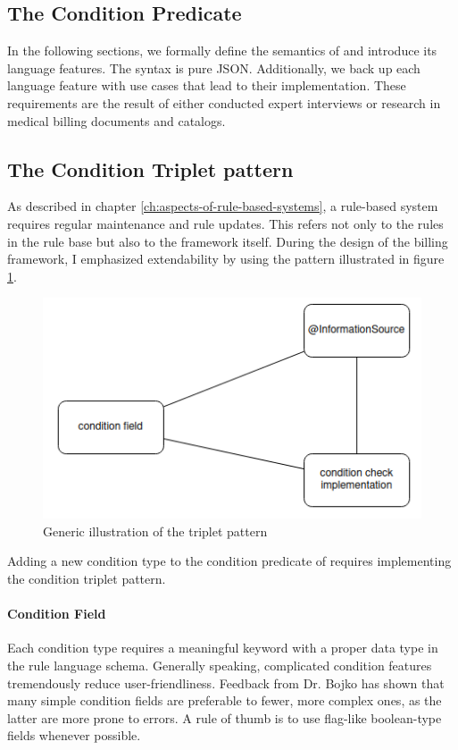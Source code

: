 \subsection{The Condition Predicate}\label{subsec:the-condition-predicate}

In the following sections, we formally define the semantics of \RL and introduce its language features.
The syntax is pure JSON.
Additionally, we back up each language feature with use cases that lead to their implementation.
These requirements are the result of either conducted expert interviews or research in medical billing documents and catalogs.

\subsection{The Condition Triplet pattern}\label{subsec:the-condition-triplet-pattern}
As described in chapter \ref{ch:aspects-of-rule-based-systems}, a rule-based system requires regular maintenance and rule updates.
This refers not only to the rules in the rule base but also to the framework itself.
During the design of the billing framework, I emphasized extendability by using the pattern illustrated in figure \ref{fig:condition-triplet-pattern}.
\begin{figure}
    \centering
    \includegraphics[width=0.75\linewidth]{./figures/condition-triplet-pattern}
    \caption{Generic illustration of the triplet pattern}
    \label{fig:condition-triplet-pattern}
\end{figure}
Adding a new condition type to the condition predicate of \RL requires implementing the condition triplet pattern.

\paragraph{Condition Field}
Each condition type requires a meaningful keyword with a proper data type in the rule language schema.
Generally speaking, complicated condition features tremendously reduce user-friendliness.
Feedback from Dr. Bojko has shown that many simple condition fields are preferable to fewer, more complex ones, as the latter are more prone to errors.
A rule of thumb is to use flag-like boolean-type fields whenever possible.

